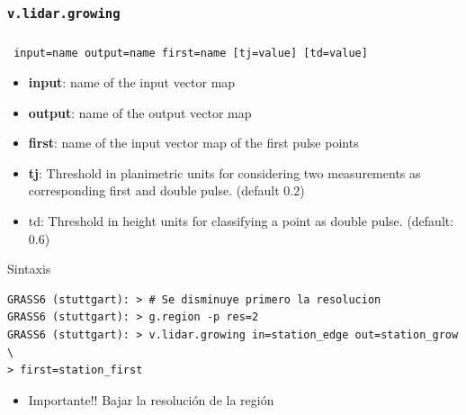 \subsubsection{\texttt{v.lidar.growing}}
\begin{frame}[fragile,shrink=10]
  \frametitle{}
  \begin{beamerboxesrounded}[shadow=true]{\textbf{}
    \texttt{ input=name output=name first=name [tj=value] [td=value]}}
    \begin{itemize}
     \item \textbf{input}: name of the input vector map
     \item \textbf{output}: name of the output vector map
     \item \textbf{first}: name of the input vector map of the first pulse points
     \item \textbf{tj}: Threshold in planimetric units for considering two 
         measurements as corresponding first and double pulse. (default 0.2)
     \item td: Threshold in height units for classifying a point as double pulse. 
         (default: 0.6)
    \end{itemize}
  \end{beamerboxesrounded}
  \begin{beamerboxesrounded}[shadow=true]{Sintaxis}
\scriptsize
\begin{verbatim}
GRASS6 (stuttgart): > # Se disminuye primero la resolucion
GRASS6 (stuttgart): > g.region -p res=2
GRASS6 (stuttgart): > v.lidar.growing in=station_edge out=station_grow \
> first=station_first
\end{verbatim}
\end{beamerboxesrounded}
\begin{itemize}
 \item \alert{Importante!!} Bajar la resolución de la región
\end{itemize}
\end{frame}
